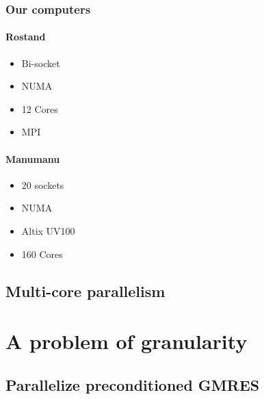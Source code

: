 \documentclass[oneside,12t]{classes/Thesis}
\begin{document}
\subsection{Our computers}
\subsubsection{Rostand}
  \begin{itemize}
    \item Bi-socket
    \item NUMA
    \item 12 Cores
    \item MPI
  \end{itemize}
\subsubsection{Manumanu}
  \begin{itemize}
    \item 20 sockets
    \item NUMA
    \item Altix UV100
    \item 160 Cores
  \end{itemize}


\section{Multi-core parallelism}










\chapter{A problem of granularity}
\minitoc
\vspace{1cm}
\section{Parallelize preconditioned GMRES}


\end{document}
